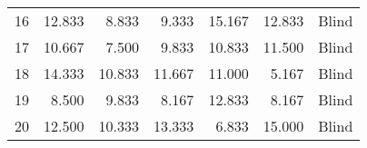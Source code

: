 \begin{table}[!htb]
\begin{tabular}{lrrrrrl}
16   & 12.833 &  8.833 &        9.333 &        15.167 &   12.833 &             Blind \\
17   & 10.667 &  7.500 &        9.833 &        10.833 &   11.500 &             Blind \\
18   & 14.333 & 10.833 &       11.667 &        11.000 &    5.167 &             Blind \\
19   &  8.500 &  9.833 &        8.167 &        12.833 &    8.167 &             Blind \\
20   & 12.500 & 10.333 &       13.333 &         6.833 &   15.000 &             Blind \\
\bottomrule
\end{tabular}
\end{table}

